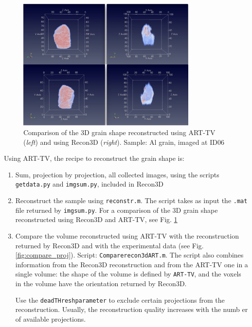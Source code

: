 \documentclass[11pt]{scrartcl}
\begin{document}
\begin{figure}[h]
    \centering
    \includegraphics[width=0.8\textwidth]{Comparison_ART_recon3d.png}
    \caption{Comparison of the 3D grain shape reconstructed using {\footnotesize{ART-TV}} ({\emph{left}}) and using Recon3D ({\emph{right}}). Sample: Al grain, imaged at {\footnotesize{ID06}}}
    \label{fig:vol_ART_recon3d}
\end{figure}

Using {\footnotesize{ART-TV}}, the recipe to reconstruct the grain shape is:
\begin{enumerate}
    \item Sum, projection by projection, all collected images, using the scripts {\texttt{getdata.py}} and {\texttt{img\textunderscore sum.py}}, included in Recon3D
    \item Reconstruct the sample using {\texttt{reconstr.m}}. The script takes as input the {\texttt{.mat}} file returned by {\texttt{img\textunderscore sum.py}}. For a comparison of the {\footnotesize{3D}} grain shape reconstructed using Recon3D and {\footnotesize{ART-TV}}, see Fig. \ref{fig:vol_ART_recon3d}
    \item Compare the volume reconstructed using {\footnotesize{ART-TV}} with the reconstruction returned by Recon3D and with the experimental data (see Fig. \ref{fig:compare_proj}). Script: {\texttt{Compare\textunderscore recon3d\textunderscore ART.m}}. The script also combines information from the Recon3D reconstruction and from the {\footnotesize{ART-TV}} one in a single volume: the shape of the volume is defined by {\texttt{ART-TV}}, and the voxels in the volume have the orientation returned by Recon3D.

    Use the {\texttt{deadTHreshparameter}} to exclude certain projections from the reconstruction. Usually, the reconstruction quality increases with the numb er of available projections.
\end{enumerate}
\end{document}
